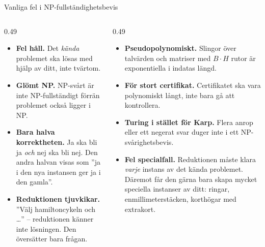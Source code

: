 \documentclass[aspectratio=169,10pt]{beamer}
\begin{document}
\begin{frame}{Vanliga fel i NP-fullständighetsbevis}
  \begin{columns}[T]
    \begin{column}{0.49\textwidth}
      \begin{itemize}
        \item<1-> \textbf{Fel håll.} Det \emph{kända} problemet ska lösas med hjälp av ditt, inte tvärtom.
        \item<2-> \textbf{Glömt NP.} NP-svårt är inte NP-fullständigt förrän problemet också ligger i NP.
        \item<3-> \textbf{Bara halva korrektheten.} Ja ska bli ja \emph{och} nej ska bli nej. Den andra halvan visas som ''ja i den nya instansen ger ja i den gamla''.
        \item<4-> \textbf{Reduktionen tjuvkikar.} ''Välj hamiltoncykeln och \dots'' -- reduktionen känner inte lösningen. Den översätter bara frågan.
      \end{itemize}
    \end{column}
    \begin{column}{0.49\textwidth}
      \begin{itemize}
        \item<5-> \textbf{Pseudopolynomiskt.} Slingor över talvärden och matriser med $B\cdot H$ rutor är exponentiella i indatas längd.
        \item<6-> \textbf{För stort certifikat.} Certifikatet ska vara polynomiskt långt, inte bara gå att kontrollera.
        \item<7-> \textbf{Turing i stället för Karp.} Flera anrop eller ett negerat svar duger inte i ett NP-svårighetsbevis.
        \item<8-> \textbf{Fel specialfall.} Reduktionen måste klara \emph{varje} instans av det kända problemet. Däremot får den gärna bara skapa mycket speciella instanser av ditt: ringar, enmillimeterstäcken, korthögar med extrakort.
      \end{itemize}
    \end{column}
  \end{columns}
\end{frame}
\end{document}
